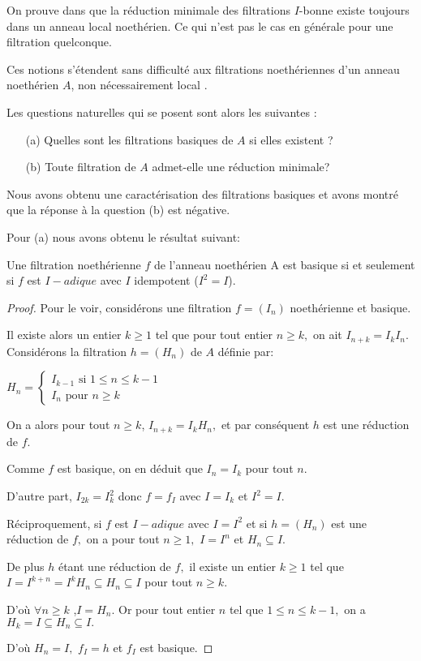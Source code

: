 \begin{maremarque}
	On prouve dans \cite{Di2} que la réduction minimale des filtrations $I$-bonne existe toujours dans un anneau local noethérien. Ce qui n'est pas le cas en générale pour une filtration quelconque.
\end{maremarque}
Ces notions s'étendent sans difficulté aux filtrations noethériennes d'un anneau noethérien $A$, non nécessairement local \cite{Di2}. 

Les questions naturelles qui se posent sont alors les suivantes :
\begin{enumerate}
	\item[(a)] Quelles sont les filtrations basiques de $A$ si elles existent ?
	\item[(b)] Toute filtration de $A$ admet-elle une réduction minimale?
\end{enumerate}

Nous avons obtenu une caractérisation des filtrations basiques et avons montré que la réponse à la question (b) est négative.

Pour (a) nous avons obtenu le résultat suivant:
\begin{maproposition}
	Une filtration noethérienne $f $ de l'anneau noethérien A est basique si et seulement si $f$ est $I-adique$ avec $I$ idempotent ($I^{2}=I$).
\end{maproposition}
\begin{proof}
	Pour le voir, considérons une filtration $f=(I_{n})$ noethérienne et basique. 
	
	Il existe alors un entier $k\geq 1$ tel que pour tout entier $n\geq k,$ on
	ait $I_{n+k}=I_{k}I_{n}.$ Considérons la filtration $h=(H_{n})$ de $A$ définie par:
	
	$H_{n}=\left\{ 
	\begin{array}{c}
		I_{k-1}\text{ si }1\leq n\leq k-1 \\ 
		I_{n}\text{ pour }n\geq k
	\end{array}
	\right. $ 
	
	On a alors pour tout $n\geq k$, $I_{n+k}=I_{k}H_{n},$ et par conséquent $h$ est une réduction de $f.$
	
	Comme $f$ est basique, on en déduit que $I_{n}=I_{k}$ pour tout $n.$
	
	D'autre part, $I_{2k}=I_{k}^{2}$ donc $f=f_{I}$ avec $I=I_{k}$ et $I^{2}=I.$
	
	Réciproquement, si $f$ est $I-adique$ avec $I=I^{2}$ et si $h=(H_{n})$ est une réduction de $f,$ on a pour tout $n\geq 1,$ $I=I^{n}$ et $
	H_{n}\subseteq I.$
	
	De plus $h$ étant une réduction de $f,$ il existe un entier $k\geq 1$
	tel que $I=I^{k+n}=I^{k}H_{n}\subseteq H_{n}\subseteq I$ pour tout $n\geq k.$
	
	D'où $\forall n\geq k$ ,$I=H_{n}.$ Or pour tout entier $n$ tel que $1\leq n\leq k-1,$ on a $H_{k}=I\subseteq H_{n}\subseteq I.$
	
	D'où $H_{n}=I,$ $f_{I}=h$ et $f_{I}$ est basique.
\end{proof}

